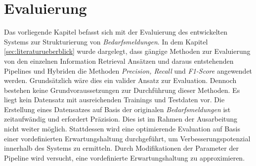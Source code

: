 \chapter{Evaluierung}
\label{chap:evaluation}
Das vorliegende Kapitel befasst sich mit der Evaluierung des entwickelten Systems zur Strukturierung von \emph{Bedarfsmeldungen}. In dem Kapitel \ref{sec:literaturueberblick} wurde dargelegt, dass gängige Methoden zur Evaluierung von den einzelnen Information Retrieval Ansätzen und daraus entstehenden Pipelines und Hybriden die Methoden \emph{Precision, Recall} und \emph{F1-Score} angewendet werden. Grundsätzlich wäre dies ein valider Ansatz zur Evaluation. Dennoch bestehen keine Grundvoraussetzungen zur Durchführung dieser Methoden. Es liegt kein Datensatz mit ausreichenden Trainings und Testdaten vor. Die Erstellung eines Datensatzes auf Basis der originalen \emph{Bedarfsmeldungen} ist zeitaufwändig und erfordert Präzision. Dies ist im Rahmen der Ausarbeitung nicht weiter möglich. Stattdessen wird eine optimierende Evaluation auf Basis einer vordefinierten Erwartungshaltung durchgeführt, um Verbesserungspotenzial innerhalb des Systems zu ermitteln. Durch Modifikationen der Parameter der Pipeline wird versucht, eine vordefinierte Erwartungshaltung zu approximieren. 






